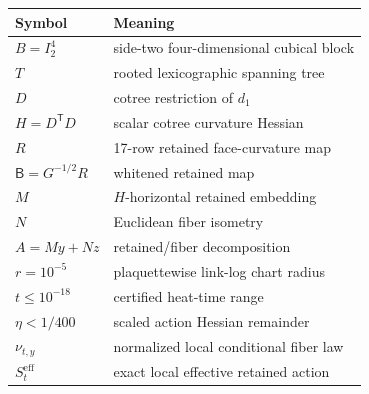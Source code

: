 \begin{tabular}{@{}ll@{}}
\toprule
Symbol & Meaning\\
\midrule
\(B=I_2^4\) & side-two four-dimensional cubical block\\
\(T\) & rooted lexicographic spanning tree\\
\(D\) & cotree restriction of \(d_1\)\\
\(H=D^{\mathsf T}D\) & scalar cotree curvature Hessian\\
\(R\) & 17-row retained face-curvature map\\
\(\mathsf B=G^{-1/2}R\) & whitened retained map\\
\(M\) & \(H\)-horizontal retained embedding\\
\(N\) & Euclidean fiber isometry\\
\(A=My+Nz\) & retained/fiber decomposition\\
\(r=10^{-5}\) & plaquettewise link-log chart radius\\
\(t\le10^{-18}\) & certified heat-time range\\
\(\eta<1/400\) & scaled action Hessian remainder\\
\(\nu_{t,y}\) & normalized local conditional fiber law\\
\(S_t^{\mathrm{eff}}\) & exact local effective retained action\\
\bottomrule
\end{tabular}

